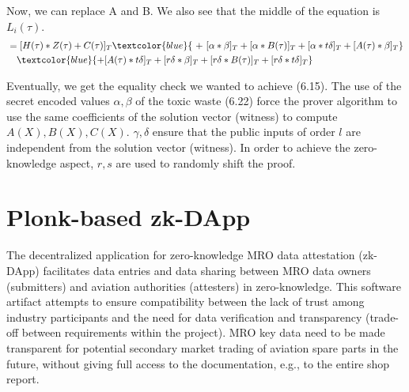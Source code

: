 Now, we can replace A and B. We also see that the middle of the equation is \(L_i(\tau)\).
 \begin{equation*}
     \begin{split}
     &=[H(\tau) * Z(\tau) + C(\tau)]_T \textcolor{blue}{\ +\  [\alpha * \beta]_T + [\alpha * B(\tau)]_T + [\alpha * t\delta]_T + [A(\tau) * \beta]_T} \\
     &\ \ \ \textcolor{blue}{+ [A(\tau) * t\delta]_T + [r\delta * \beta]_T + [r\delta * B(\tau)]_T + [r\delta * t\delta]_T}
     \end{split}
 \end{equation*}

Eventually, we get the equality check we wanted to achieve (6.15). The use of the secret encoded values \(\alpha, \beta\) of the toxic waste (6.22) force the prover algorithm to use the same coefficients of the solution vector (witness) to compute \(A(X), B(X), C(X)\). \(\gamma, \delta\) ensure that the public inputs of order \(l\) are independent from the solution vector (witness). In order to achieve the zero-knowledge aspect, \(r, s\) are used to randomly shift the proof.

\section{Plonk-based zk-DApp}
The decentralized application for zero-knowledge MRO data attestation (zk-DApp) facilitates data entries and data sharing between MRO data owners (submitters) and aviation authorities (attesters) in zero-knowledge. This software artifact attempts to ensure compatibility between the lack of trust among industry participants and the need for data verification and transparency (trade-off between requirements within the project). MRO key data need to be made transparent for potential secondary market trading of aviation spare parts in the future, without giving full access to the documentation, e.g., to the entire shop report.

